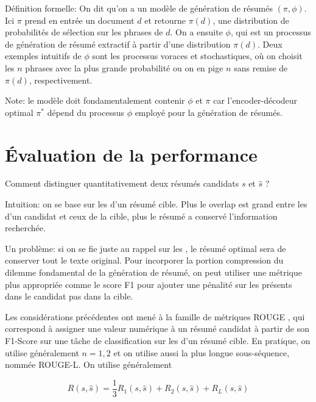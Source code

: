 Définition formelle: On dit qu'on a un modèle de génération de résumés
$(\pi, \phi)$.
Ici $\pi$ prend en entrée un document $d$ et retourne
$\pi(d)$, une distribution de probabilités de sélection sur les phrases
de $d$. On a ensuite $\phi$, qui est un processus de génération de résumé
extractif à partir d'une distribution $\pi(d)$.
Deux exemples intuitifs de $\phi$ sont les processus voraces et stochastiques,
où on choisit les $n$ phrases avec la plus grande probabilité ou on en pige
$n$ sans remise de $\pi(d)$, respectivement.

Note: le modèle doit fondamentalement contenir $\phi$ et $\pi$ car
l'encoder-décodeur optimal $\pi^*$ dépend du processus $\phi$ employé
pour la génération de résumés.


\section{Évaluation de la performance}

Comment distinguer quantitativement deux résumés candidats $s$ et $\hat{s}$ ?

Intuition: on se base sur les \ngrams d'un résumé cible. Plus le overlap
est grand entre les \ngrams d'un candidat et ceux de la cible, plus le résumé
a conservé l'information recherchée.

Un problème: si on se fie juste au rappel sur les \ngrams, le résumé optimal sera
de conserver tout le texte original. Pour incorporer la portion compression du dilemme
fondamental de la génération de résumé, on peut utiliser une métrique plus
appropriée comme le score F1 pour ajouter une pénalité sur les \ngrams présents dans
le candidat pas dans la cible.

Les considérations précédentes ont mené à la famille de métriques ROUGE \citep{lin-2004-rouge},
qui correspond à assigner une valeur numérique à un résumé candidat à partir
de son F1-Score sur une tâche de classification sur les \ngrams d'un résumé cible.
En pratique, on utilise généralement $n={1,2}$ et on utilise aussi la plus longue
sous-séquence, nommée ROUGE-L. On utilise généralement

\begin{equation}
    \label{eq:ROUGE}
    R(s, \hat{s}) = \frac{1}{3} R_1(s, \hat{s}) + R_2(s, \hat{s}) + R_L(s, \hat{s})
\end{equation}

